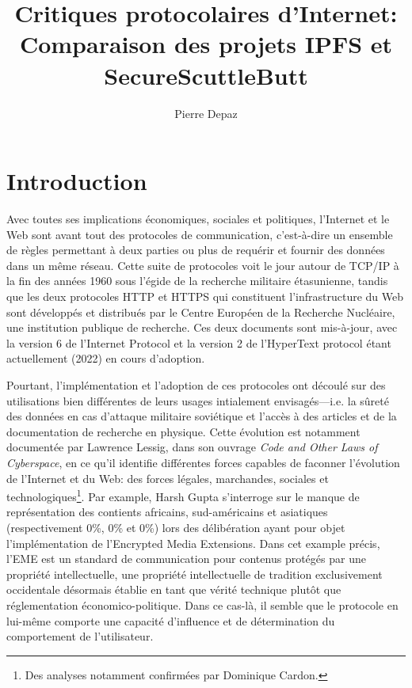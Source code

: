 \documentclass{article}
\begin{document}
\title{Critiques protocolaires d'Internet: Comparaison des projets IPFS et SecureScuttleButt}
\author{Pierre Depaz}
\maketitle

\section{Introduction}

Avec toutes ses implications économiques, sociales et politiques, l'Internet et le Web\cite{fielding_hypertext_2014} sont avant tout des protocoles de communication, c'est-à-dire un ensemble de règles permettant à deux parties ou plus de requérir et fournir des données dans un même réseau. Cette suite de protocoles voit le jour autour de TCP/IP à la fin des années 1960 sous l'égide de la recherche militaire étasunienne, tandis que les deux protocoles HTTP et HTTPS qui constituent l'infrastructure du Web sont développés et distribués par le Centre Européen de la Recherche Nucléaire, une institution publique de recherche. Ces deux documents sont mis-à-jour, avec la version 6 de l'Internet Protocol et la version 2 de l'HyperText protocol étant actuellement (2022) en cours d'adoption.

Pourtant, l'implémentation et l'adoption de ces protocoles ont découlé sur des utilisations bien différentes de leurs usages intialement envisagés—i.e. la sûreté des données en cas d'attaque militaire soviétique et l'accès à des articles et de la documentation de recherche en physique. Cette évolution est notamment documentée par Lawrence Lessig, dans son ouvrage \emph{Code and Other Laws of Cyberspace}\cite{lessig_code_1999}, en ce qu'il identifie différentes forces capables de faconner l'évolution de l'Internet et du Web: des forces légales, marchandes, sociales et technologiques\footnote{Des analyses notamment confirmées par Dominique Cardon\cite{cardon_culture_2019}.}. Par example, Harsh Gupta s'interroge sur le manque de représentation des contients africains, sud-américains et asiatiques (respectivement 0\%, 0\% et 0\%) lors des délibération ayant pour objet l'implémentation de l'Encrypted Media Extensions\cite{gupta_lack_2016}. Dans cet example précis, l'EME est un standard de communication pour contenus protégés par une propriété intellectuelle, une propriété intellectuelle de tradition exclusivement occidentale désormais établie en tant que vérité technique plutôt que réglementation économico-politique. Dans ce cas-là, il semble que le protocole en lui-même comporte une capacité d'influence et de détermination du comportement de l'utilisateur.
\end{document}
